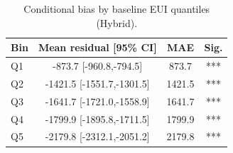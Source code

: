 \begin{table}[t]
\centering
\caption{Conditional bias by baseline EUI quantiles (Hybrid).}
\label{tab:bias_by_eui}
\begin{tabular}{l S S S}
\toprule
Bin & {Mean residual [95\% CI]} & {MAE} & {Sig.} \\
\midrule
Q1 & -873.7 [-960.8,-794.5] & 873.7 & *** \\
Q2 & -1421.5 [-1551.7,-1301.5] & 1421.5 & *** \\
Q3 & -1641.7 [-1721.0,-1558.9] & 1641.7 & *** \\
Q4 & -1799.9 [-1895.8,-1711.5] & 1799.9 & *** \\
Q5 & -2179.8 [-2312.1,-2051.2] & 2179.8 & *** \\
\bottomrule
\end{tabular}
\end{table}